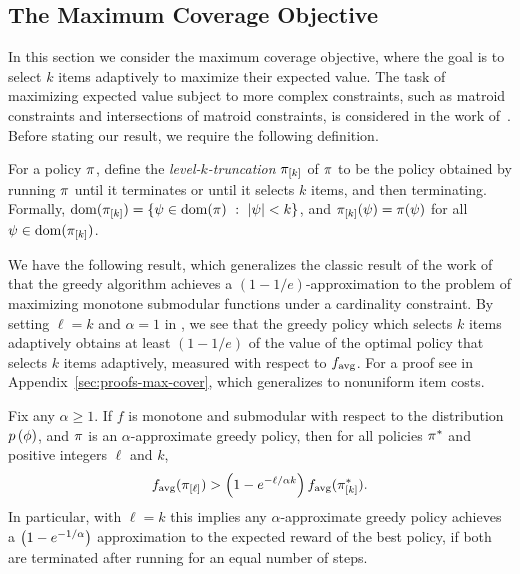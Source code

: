 \subsection{The Maximum Coverage Objective} \label{ssec:max-cover-objective}

In this section we consider the maximum coverage objective, where the
goal is to select $k$ items adaptively to maximize their expected
value.  The task of maximizing expected value subject to more complex 
constraints, such as matroid constraints and intersections of matroid
constraints, is considered in the work of~\citet{golovin11matroid_arxiv}. 
Before stating our result, we require the following definition.

\begin{definition} \label{def:policy-truncation}
  For a policy $\pi$, define the \emph{level-$k$-truncation}
  $ \pi_{[{k}]} $ of $\pi$ to be the policy obtained by
  running $\pi$ until it terminates or until it selects $k$ items,
  and then terminating.  Formally, 
  $\operatorname{dom}( \pi_{[{k}]} ) = \left\{{\color{black}{\ensuremath{\psi}}} \in \operatorname{dom}(\pi)\  : \
    |{\color{black}{\ensuremath{\psi}}}| < k\right\} $, and $ \pi_{[{k}]} ({\color{black}{\ensuremath{\psi}}}) = \pi({\color{black}{\ensuremath{\psi}}})$
  for all ${\color{black}{\ensuremath{\psi}}} \in \operatorname{dom}( \pi_{[{k}]} )$.
\end{definition}


 We have the following result, which generalizes the 
classic result of the work of~\citet{nemhauser78} that the greedy algorithm
achieves a $(1-1/e)$-approximation to the problem of 
maximizing monotone submodular functions under a
cardinality constraint.  By setting $\ell = k$ and $\alpha = 1$ in
\thmref{thm:max-cover}, we see 
that the greedy policy which selects $k$ items adaptively obtains at
least $(1-1/e)$ of the value of the optimal policy that selects $k$ items adaptively,
measured with respect to $f_{\text{avg}}$.
For a proof see
 in
Appendix~\ref{sec:proofs-max-cover}, 
which generalizes  to nonuniform item costs.


\begin{theorem} \label{thm:max-cover}
Fix any $\alpha \ge 1$.
If $f$ is \term monotone and \term submodular with respect to the
distribution 
%
${\color{black}{\ensuremath{p \left( {{\color{black}{\ensuremath{\phi}}}} \right) }}}$, and $\pi$ is an
$\alpha$-approximate greedy policy, then for all policies $\pi^*$ and positive
integers $\ell$ and $k$, 
\[
f_{\text{avg}}( \pi_{[{\ell}]} ) >  \left( {1 - e^{-\ell/\alpha k}} \right) 
f_{\text{avg}}( \pi^*_{[{k}]} ) 
\mbox{.}
\]
In particular, with $\ell = k$ this implies any $\alpha$-approximate
greedy policy achieves a $ \left( {1 - e^{-1/\alpha}} \right) $ approximation to
the expected reward of the best
policy, if both are terminated after running for an equal number of steps. 
\end{theorem}




